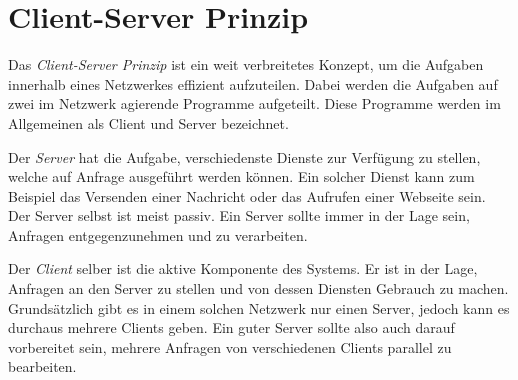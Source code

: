 \documentclass[a4paper,11pt]{report}
\begin{document}
		\section{Client-Server Prinzip}
		Das \emph{Client-Server Prinzip} ist ein weit verbreitetes Konzept, um die Aufgaben innerhalb eines Netzwerkes effizient aufzuteilen. Dabei werden die Aufgaben auf zwei im Netzwerk agierende Programme aufgeteilt. Diese Programme werden im Allgemeinen als Client und Server bezeichnet.
	 
		Der \emph{Server} hat die Aufgabe, verschiedenste Dienste zur Verfügung zu stellen, welche auf Anfrage ausgeführt werden können. Ein solcher Dienst kann zum Beispiel das Versenden einer Nachricht oder das Aufrufen einer Webseite sein. Der Server selbst ist meist passiv. Ein Server sollte immer in der Lage sein, Anfragen entgegenzunehmen und zu verarbeiten.

		Der \emph{Client} selber ist die aktive Komponente des Systems. Er ist in der Lage, Anfragen an den Server zu stellen und von dessen Diensten Gebrauch zu machen.
		Grundsätzlich gibt es in einem solchen Netzwerk nur einen Server, jedoch kann es durchaus mehrere Clients geben. Ein guter Server sollte also auch darauf vorbereitet sein, mehrere Anfragen von verschiedenen Clients parallel zu bearbeiten. \cite{fachadmin.de:ServerClient}
		
		
\end{document}
